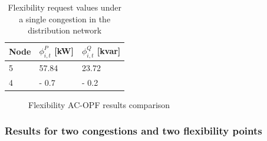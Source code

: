 \begin{table}[htbp]
\centering
\caption{Flexibility request values under a single congestion in the distribution network}
\label{tab:FR_case1}
\begin{tabular}{lll} 
\toprule
Node & $\phi_{i,t}^{P}$ [kW] & $\phi_{i,t}^{Q}$ [kvar]  \\ 
\hline
5    & 57.84      & 23.72         \\
4    & - 0.7      & - 0.2         \\
\bottomrule
\end{tabular}
\end{table}

\begin{figure}[htbp]
\centering     %
{}
\caption{Flexibility AC-OPF results comparison}
\label{fig:case1_fr}
\end{figure}


\subsubsection{Results for two congestions and two flexibility points}

